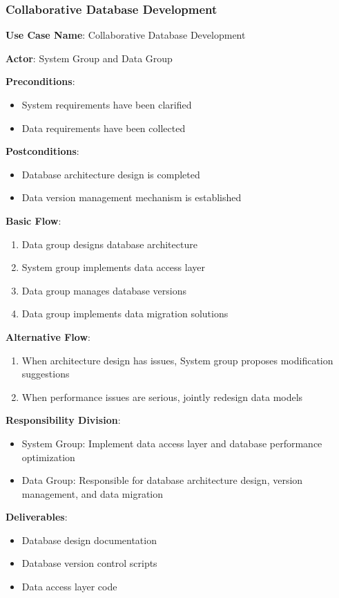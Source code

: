 \documentclass[a4paper,12pt]{article}
\begin{document}
\subsubsection{Collaborative Database Development}

\textbf{Use Case Name}: Collaborative Database Development

\textbf{Actor}: System Group and Data Group

\textbf{Preconditions}:
\begin{itemize}
  \item System requirements have been clarified
  \item Data requirements have been collected
\end{itemize}

\textbf{Postconditions}:
\begin{itemize}
  \item Database architecture design is completed
  \item Data version management mechanism is established
\end{itemize}

\textbf{Basic Flow}:
\begin{enumerate}
  \item Data group designs database architecture
  \item System group implements data access layer
  \item Data group manages database versions
  \item Data group implements data migration solutions
\end{enumerate}

\textbf{Alternative Flow}:
\begin{enumerate}
  \item When architecture design has issues, System group proposes modification suggestions
  \item When performance issues are serious, jointly redesign data models
\end{enumerate}

\textbf{Responsibility Division}:
\begin{itemize}
  \item System Group: Implement data access layer and database performance optimization
  \item Data Group: Responsible for database architecture design, version management, and data migration
\end{itemize}

\textbf{Deliverables}:
\begin{itemize}
  \item Database design documentation
  \item Database version control scripts
  \item Data access layer code
\end{itemize}
\end{document}
